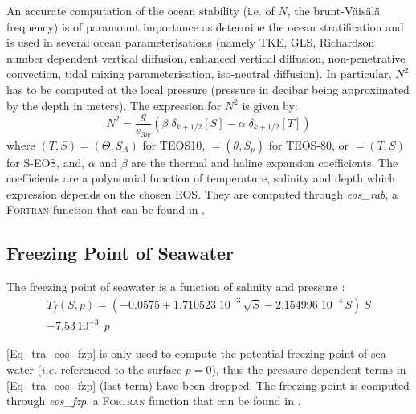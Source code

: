 \documentclass[NEMO_book]{subfiles}
\begin{document}
An accurate computation of the ocean stability (i.e. of $N$, the brunt-V\"{a}is\"{a}l\"{a}
 frequency) is of paramount importance as determine the ocean stratification and 
 is used in several ocean parameterisations (namely TKE, GLS, Richardson number dependent 
 vertical diffusion, enhanced vertical diffusion, non-penetrative convection, tidal mixing 
 parameterisation, iso-neutral diffusion). In particular, $N^2$ has to be computed at the local pressure 
 (pressure in decibar being approximated by the depth in meters). The expression for $N^2$ 
 is given by: 
\begin{equation} \label{Eq_tra_bn2}
N^2 =	\frac{g}{e_{3w}} \left(   \beta \;\delta_{k+1/2}[S] - \alpha \;\delta_{k+1/2}[T]   \right)
\end{equation} 
where $(T,S) = (\Theta, S_A)$ for TEOS10, $= (\theta, S_p)$ for TEOS-80, or $=(T,S)$ for S-EOS, 
and, $\alpha$ and $\beta$ are the thermal and haline expansion coefficients. 
The coefficients are a polynomial function of temperature, salinity and depth which expression 
depends on the chosen EOS. They are computed through \textit{eos\_rab}, a \textsc{Fortran} 
function that can be found in .

\subsection   [Freezing Point of Seawater]
			{Freezing Point of Seawater}
\label{TRA_fzp}

The freezing point of seawater is a function of salinity and pressure \citep{UNESCO1983}:
\begin{equation} \label{Eq_tra_eos_fzp}
   \begin{split}
T_f (S,p) = \left( -0.0575 + 1.710523 \;10^{-3} \, \sqrt{S} 
						     -  2.154996 \;10^{-4} \,S  \right) \ S    \\
               - 7.53\,10^{-3} \ \ p 
   \end{split}
\end{equation}

\eqref{Eq_tra_eos_fzp} is only used to compute the potential freezing point of 
sea water ($i.e.$ referenced to the surface $p=0$), thus the pressure dependent 
terms in \eqref{Eq_tra_eos_fzp} (last term) have been dropped. The freezing
point is computed through \textit{eos\_fzp}, a \textsc{Fortran} function that can be found 
in .  
\end{document}
